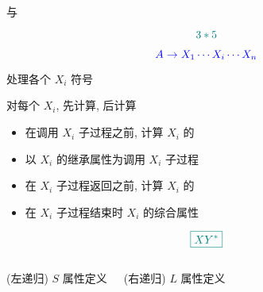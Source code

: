 \begin{frame}{}
  \begin{center}
     与 

    \vspace{0.30cm}
    \vspace{-0.20cm}
    \[
      \textcolor{teal}{3 \ast 5}
    \]

    \vspace{-0.50cm}
    \[
      \textcolor{blue}{A \to X_{1} \cdots X_{i} \cdots X_{n}}
    \]

     处理各个 $X_{i}$ 符号

    \vspace{0.10cm}
    对每个 $X_{i}$, 先计算, 后计算
  \end{center}
\end{frame}

\begin{frame}{}
  \begin{center}

    \vspace{0.80cm}
    \begin{itemize}
      \centering
      \setlength{\itemsep}{15pt}
      \item 在调用 $X_{i}$ 子过程之前, 计算 $X_{i}$ 的
      \item 以 $X_{i}$ 的继承属性为调用 $X_{i}$ 子过程
      \vspace{10pt}
      \item 在 $X_{i}$ 子过程返回之前, 计算 $X_{i}$ 的
      \item 在 $X_{i}$ 子过程结束时 $X_{i}$ 的综合属性
    \end{itemize}
  \end{center}
\end{frame}

\begin{frame}{}
  \begin{center}
  \end{center}

  \vspace{-1.00cm}
  \[
    \textcolor{teal}{\boxed{X Y^{\ast}}}
  \]

  \begin{columns}
      \centerline{(左递归) $S$ 属性定义}
      \vspace{-0.80cm}
      
      \pause
      \centerline{(右递归) $L$ 属性定义}
      \vspace{-0.80cm}
      {}
  \end{columns}
\end{frame}

